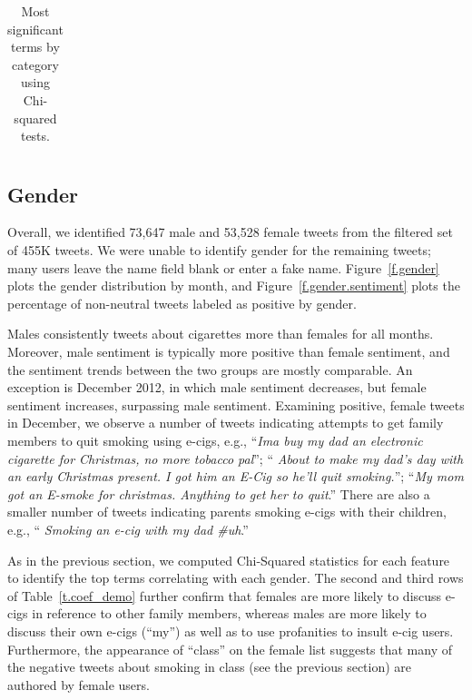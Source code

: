 \documentclass{sig-alternate}
\begin{document}
\begin{table}[t]
\centering
\caption{Most significant terms by category using Chi-squared tests. \label{t.coef_demo}}
\label{tab:terms}
\begin{tabular}{|r|p{14cm}| }
\hline

\hline
\end{tabular}
\end{table}


\subsection{Gender}

Overall, we identified 73,647 male and 53,528 female tweets from the filtered
set of 455K tweets. We were unable to identify gender for the remaining
tweets; many users leave the name field blank or enter a fake
name. Figure~\ref{f.gender} plots the gender distribution by month, and
Figure~\ref{f.gender.sentiment} plots the percentage of non-neutral tweets
labeled as positive by gender.

Males consistently tweets about cigarettes more than females for all
months. Moreover, male sentiment is typically more positive than female
sentiment, and the sentiment trends between the two groups are mostly
comparable. An exception is December 2012, in which male sentiment decreases,
but female sentiment increases, surpassing male sentiment. Examining positive,
female tweets in December, we observe a number of tweets indicating attempts
to get family members to quit smoking using e-cigs, e.g., ``{\sl Ima buy my
  dad an electronic cigarette for Christmas, no more tobacco pal}''; ``{\sl
  About to make my dad's day with an early Christmas present. I got him an
  E-Cig so he'll quit smoking.}''; ``{\sl My mom got an E-smoke for
  christmas. Anything to get her to quit}.'' There are also a smaller number
of tweets indicating parents smoking e-cigs with their children, e.g., ``{\sl
  Smoking an e-cig with my dad \#uh}.''

As in the previous section, we computed Chi-Squared statistics for each feature
to identify the top terms correlating with each gender. The second and third
rows of Table~\ref{t.coef_demo} further confirm that females are more likely
to discuss e-cigs in reference to other family members, whereas males are more
likely to discuss their own e-cigs (``my'') as well as to use profanities to
insult e-cig users. Furthermore, the appearance of ``class'' on the female
list suggests that many of the negative tweets about smoking in class (see the
previous section) are authored by female users.
\end{document}
